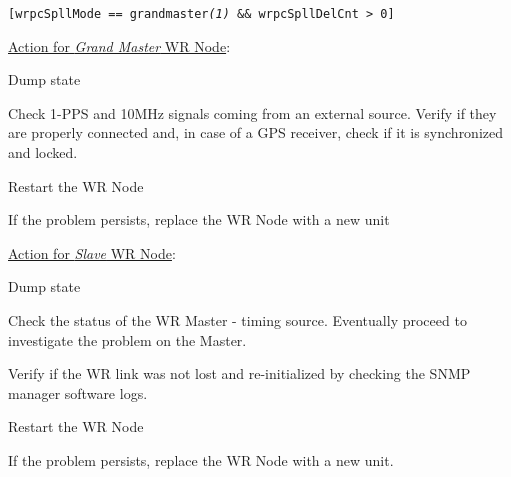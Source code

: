 \begin{pck_descr}
				{\footnotesize
        \texttt{[wrpcSpllMode == grandmaster\emph{(1)} \&\& wrpcSpllDelCnt > 0]}} %
      \item [] \underline{Action for \emph{Grand Master} WR Node}:
        \begin{pck_proc}
        \item Dump state
        \item Check 1-PPS and 10MHz signals coming from an external source.
          Verify if they are properly connected and, in case of a GPS receiver,
          check if it is synchronized and locked.
        \item Restart the WR Node
        \item If the problem persists, replace the WR Node with a new unit
        \end{pck_proc}
      \item [] \underline{Action for \emph{Slave} WR Node}:
        \begin{pck_proc}
        \item Dump state
        \item Check the status of the WR Master - timing source. Eventually
          proceed to investigate the problem on the Master.
        \item Verify if the WR link was not lost and re-initialized by checking
          the SNMP manager software logs.
        \item Restart the WR Node
        \item If the problem persists, replace the WR Node with a new unit.
        \end{pck_proc}
		\end{pck_descr}

